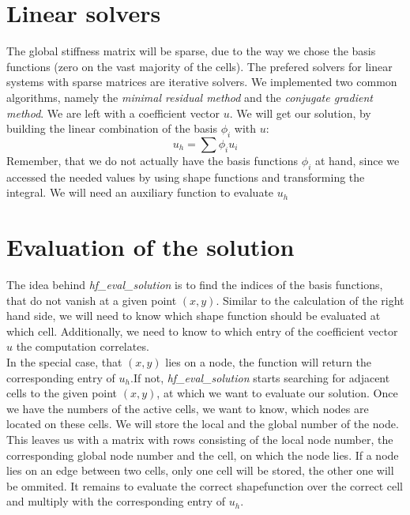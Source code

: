 \section{Linear solvers}
The global stiffness matrix will be sparse, due to the way we chose the basis functions (zero on the vast majority of the cells). The prefered solvers for linear systems with sparse matrices are iterative solvers. We implemented two common algorithms, namely the \textit{minimal residual method} and the \textit{conjugate gradient method}. 
We are left with a coefficient vector $u$. We will get our solution, by building the linear combination of the basis ${\phi_i}$ with $u$: 
\[u_h = \sum \phi_i u_i\]
Remember, that we do not actually have the basis functions $\phi_i$ at hand, since we accessed the needed values by using shape functions and transforming the integral. We will need an auxiliary function to evaluate $u_h$

\section{Evaluation of the solution}
The idea behind \textit{hf\_eval\_solution} is to find the indices of the basis functions, that do not vanish at a given point $(x,y)$. Similar to the calculation of the right hand side, we will need to know which shape function should be evaluated at which cell. Additionally, we need to know to which entry of the coefficient vector $u$ the computation correlates.\\
In the special case, that $(x,y)$ lies on a node, the function will return the corresponding entry of $u_h$.If not, \textit{hf\_eval\_solution} starts searching for adjacent cells to the given point $(x,y)$, at which we want to evaluate our solution. Once we have the numbers of the active cells, we want to know, which nodes are located on these cells. We will store the local and the global number of the node. This leaves us with a matrix with rows consisting of the local node number, the corresponding global node number and the cell, on which the node lies. If a node lies on an edge between two cells, only one cell will be stored, the other one will be ommited. It remains to evaluate the correct shapefunction over the correct cell and multiply with the corresponding entry of $u_h$.

